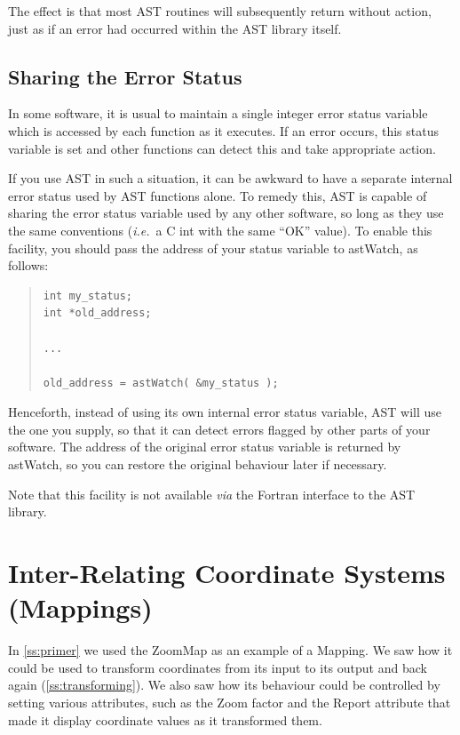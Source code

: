 \documentclass[twoside,11pt]{article}
\newcommand{\htmlref}[2]{#1}
\newcommand{\secref}[1]{\S\ref{#1}}
\renewcommand{\secref}[1]{\ref{#1}}
\begin{document}
The effect is that most AST routines will subsequently return without
action, just as if an error had occurred within the AST library
itself.

\subsection{Sharing the Error Status}

In some software, it is usual to maintain a single integer error
status variable which is accessed by each function as it executes. If
an error occurs, this status variable is set and other functions can
detect this and take appropriate action.

If you use AST in such a situation, it can be awkward to have a
separate internal error status used by AST functions alone. To remedy
this, AST is capable of sharing the error status variable used by any
other software, so long as they use the same conventions
({\em{i.e.}}\ a C int with the same ``OK'' value). To enable this
facility, you should pass the address of your status variable to
\htmlref{astWatch}{astWatch}, as follows:

\begin{quote}
\small
\begin{verbatim}
int my_status;
int *old_address;

...

old_address = astWatch( &my_status );
\end{verbatim}
\normalsize
\end{quote}

Henceforth, instead of using its own internal error status variable,
AST will use the one you supply, so that it can detect errors flagged
by other parts of your software. The address of the original error
status variable is returned by astWatch, so you can restore the
original behaviour later if necessary.

Note that this facility is not available {\em{via}} the Fortran
interface to the AST library.

\cleardoublepage
\section{\label{ss:mappings}Inter-Relating Coordinate Systems (Mappings)}

In \secref{ss:primer} we used the \htmlref{ZoomMap}{ZoomMap} as an example of a
\htmlref{Mapping}{Mapping}. We saw how it could be used to transform coordinates from its
input to its output and back again (\secref{ss:transforming}). We also
saw how its behaviour could be controlled by setting various
attributes, such as the \htmlref{Zoom}{Zoom} factor and the \htmlref{Report}{Report} attribute that made
it display coordinate values as it transformed them.
\end{document}
